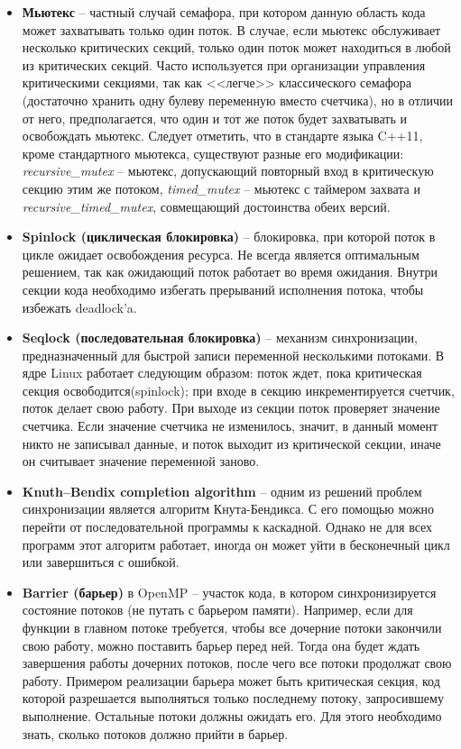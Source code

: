 \begin{itemize}
    \item{\textbf{Мьютекс} -- частный случай семафора, при котором данную область кода может захватывать только один поток. В случае, если мьютекс обслуживает несколько критических секций, только один поток может находиться в любой из критических секций. Часто используется при организации управления критическими секциями, так как <<легче>> классического семафора (достаточно хранить одну булеву переменную вместо счетчика), но в отличии от него, предполагается, что один и тот же поток будет захватывать и освобождать мьютекс. Следует отметить, что в стандарте языка C++11, кроме стандартного мьютекса, существуют разные его модификации:  \textit{recursive\_mutex} -- мьютекс, допускающий повторный вход в критическую секцию этим же потоком, 
    \textit{timed\_mutex} -- мьютекс с таймером захвата и  \textit{recursive\_timed\_mutex}, совмещающий достоинства обеих версий.}
    
    \item\textbf{Spinlock (циклическая блокировка)} -- блокировка, при которой поток в цикле ожидает освобождения ресурса.
    Не всегда является оптимальным решением, так как ожидающий поток работает во время ожидания.
    Внутри секции кода необходимо избегать прерываний исполнения потока, чтобы избежать deadlock'a.
    
    \item\textbf{Seqlock (последовательная блокировка)} -- механизм синхронизации, предназначенный для быстрой записи переменной несколькими потоками.
    В ядре Linux работает следующим образом: поток ждет, пока критическая секция освободится(spinlock); при входе в секцию инкрементируется счетчик, поток делает свою работу.
    При выходе из секции поток проверяет значение счетчика.
    Если значение счетчика не изменилось, значит, в данный момент никто не записывал данные, и поток выходит из критической секции, иначе он считывает значение переменной заново.
    
    \item\textbf{Knuth–Bendix completion algorithm} -- одним из решений проблем синхронизации является алгоритм Кнута-Бендикса.
    С его помощью можно перейти от последовательной программы к каскадной.
    Однако не для всех программ этот алгоритм работает, иногда он может уйти в бесконечный цикл или завершиться с ошибкой.
    
    \item\textbf{Barrier (барьер)} в OpenMP -- участок кода, в котором синхронизируется состояние потоков (не путать с барьером памяти).
    Например, если для функции в главном потоке требуется, чтобы все дочерние потоки закончили свою работу, можно поставить барьер перед ней.
    Тогда она будет ждать завершения работы дочерних потоков, после чего все потоки продолжат свою работу.
    Примером реализации барьера может быть критическая секция, код которой разрешается выполняться только последнему потоку, запросившему выполнение.
    Остальные потоки должны ожидать его.
    Для этого необходимо знать, сколько потоков должно прийти в барьер.
    

\end{itemize}
